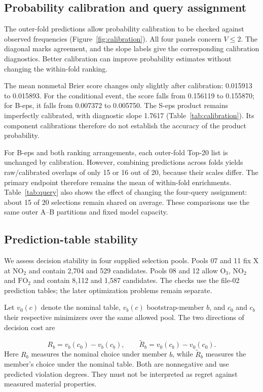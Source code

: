 \subsection{Probability calibration and query assignment}
The outer-fold predictions allow probability calibration to be checked against observed frequencies (Figure~\ref{fig:calibration}). All four panels concern $V\le2$. The diagonal marks agreement, and the slope labels give the corresponding calibration diagnostics. Better calibration can improve probability estimates without changing the within-fold ranking.

The mean nonmetal Brier score changes only slightly after calibration: 0.015913 to 0.015893. For the conditional event, the score falls from 0.156119 to 0.155870; for B-eps, it falls from 0.007372 to 0.005750. The S-eps product remains imperfectly calibrated, with diagnostic slope 1.7617 (Table~\ref{tab:calibration}). Its component calibrations therefore do not establish the accuracy of the product probability.


For B-eps and both ranking arrangements, each outer-fold Top-20 list is unchanged by calibration. However, combining predictions across folds yields raw/calibrated overlaps of only 15 or 16 out of 20, because their scales differ. The primary endpoint therefore remains the mean of within-fold enrichments. Table~\ref{tab:query} also shows the effect of changing the four-query assignment: about 15 of 20 selections remain shared on average. These comparisons use the same outer A--B partitions and fixed model capacity.

\FloatBarrier

\subsection{Prediction-table stability}
We assess decision stability in four supplied selection pools. Pools 07 and 11 fix X at $\mathrm{NO_2}$ and contain 2,704 and 529 candidates. Pools 08 and 12 allow $\mathrm{O_3}$, $\mathrm{NO_2}$ and $\mathrm{FO_2}$ and contain 8,112 and 1,587 candidates. The checks use the file-02 prediction tables; the later optimization problems remain separate.

Let $v_0(c)$ denote the nominal table, $v_b(c)$ bootstrap-member $b$, and $c_0$ and $c_b$ their respective minimizers over the same allowed pool. The two directions of decision cost are
\begin{samepage}
\begin{equation}
 R_b=v_b(c_0)-v_b(c_b),\qquad
 \widetilde R_b=v_0(c_b)-v_0(c_0).
 \label{eq:surrogate-regret}
\end{equation}
\noindent Here $R_b$ measures the nominal choice under member $b$, while $\widetilde R_b$ measures the member's choice under the nominal table. Both are nonnegative and use predicted violation degrees. They must not be interpreted as regret against measured material properties.
\end{samepage}

